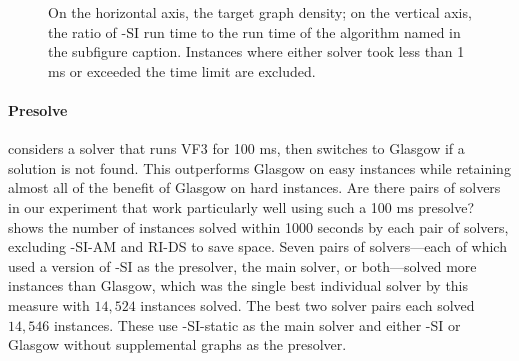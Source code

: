 \begin{figure}[htb]
    \centering
    \caption{On the horizontal axis, the target graph density; on the vertical axis, the ratio of \McSplit-SI run time to
            the run time of the algorithm named in the subfigure caption.
            Instances where either solver took less than 1 ms or exceeded the time limit are excluded.}
    \label{figure:density-runtime-ratio}
\end{figure}

\FloatBarrier

\paragraph*{Presolve} \cite{DBLP:conf/gbrpr/Solnon19} considers a solver that
runs VF3 for 100 ms, then switches to Glasgow if a solution is not found. This
outperforms Glasgow on easy instances while retaining almost all of the benefit
of Glasgow on hard instances.  Are there pairs of solvers in our experiment
that work particularly well using such a 100 ms presolve?
 shows the number of instances solved
within 1000 seconds by each pair of solvers, excluding \McSplit-SI-AM and RI-DS
to save space.  Seven pairs of solvers---each of which used a version of \McSplit-SI
as the presolver, the main solver, or both---solved more instances than Glasgow,
which was the single
best individual solver by this measure with $14,524$ instances solved.
The best two solver pairs
each solved $14,546$ instances.  These use \McSplit-SI-static as the main
solver and either \McSplit-SI or Glasgow without supplemental graphs as the
presolver.

